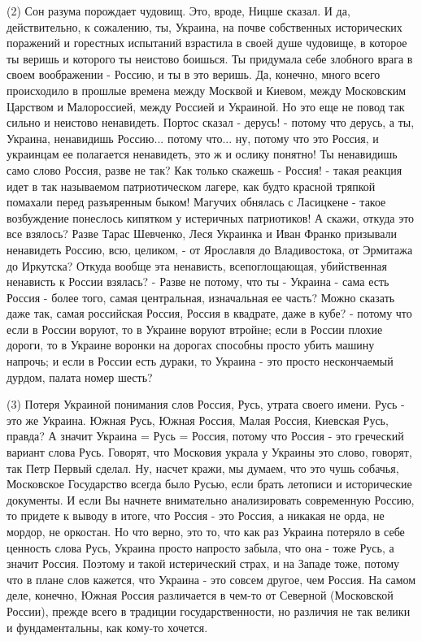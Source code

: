 (2) Сон разума порождает чудовищ. Это, вроде, Ницше сказал. И да,
действительно, к сожалению, ты, Украина, на почве собственных исторических
поражений и горестных испытаний взрастила в своей душе чудовище, в которое ты
веришь и которого ты неистово боишься. Ты придумала себе злобного врага в своем
воображении - Россию, и ты в это веришь. Да, конечно, много всего происходило в
прошлые времена между Москвой и Киевом, между Московским Царством и
Малороссией, между Россией и Украиной.  Но это еще не повод так сильно и
неистово ненавидеть. Портос сказал - дерусь! - потому что дерусь, а ты,
Украина, ненавидишь Россию... потому что... ну, потому что это Россия, и
украинцам ее полагается ненавидеть, это ж и ослику понятно! Ты ненавидишь само
слово Россия, разве не так? Как только скажешь - Россия! - такая реакция идет в
так называемом патриотическом лагере, как будто красной тряпкой помахали перед
разъяренным быком! Магучих обнялась с Ласицкене - такое возбуждение понеслось
кипятком у истеричных патриотиков! А скажи, откуда это все взялось? Разве Тарас
Шевченко, Леся Украинка и Иван Франко призывали ненавидеть Россию, всю,
целиком, - от Ярославля до Владивостока, от Эрмитажа до Иркутска? Откуда вообще
эта ненависть, всепоглощающая, убийственная ненависть к России взялась? - Разве
не потому, что ты - Украина - сама есть Россия - более того, самая центральная,
изначальная ее часть? Можно сказать даже так, самая российская Россия, Россия в
квадрате, даже в кубе? - потому что если в России воруют, то в Украине воруют
втройне; если в России плохие дороги, то в Украине воронки на дорогах способны
просто убить машину напрочь; и если в России есть дураки, то Украина - это
просто нескончаемый дурдом, палата номер шесть?

(3) Потеря Украиной понимания слов Россия, Русь, утрата своего имени. Русь -
это же Украина. Южная Русь, Южная Россия, Малая Россия, Киевская Русь, правда?
А значит Украина = Русь = Россия, потому что Россия - это греческий вариант
слова Русь. Говорят, что Московия украла у Украины это слово, говорят, так Петр
Первый сделал. Ну, насчет кражи, мы думаем, что это чушь собачья, Московское
Государство всегда было Русью, если брать летописи и исторические документы. И
если Вы начнете внимательно анализировать современную Россию, то придете к
выводу в итоге, что Россия - это Россия, а никакая не орда, не мордор, не
оркостан. Но что верно, это то, что как раз Украина потеряло в себе ценность
слова Русь, Украина просто напросто забыла, что она - тоже Русь, а значит
Россия. Поэтому и такой истерический страх, и на Западе тоже, потому что в
плане слов кажется, что Украина - это совсем другое, чем Россия. На самом деле,
конечно, Южная Россия различается в чем-то от Северной (Московской России),
прежде всего в традиции государственности, но различия не так велики и
фундаментальны, как кому-то хочется.
